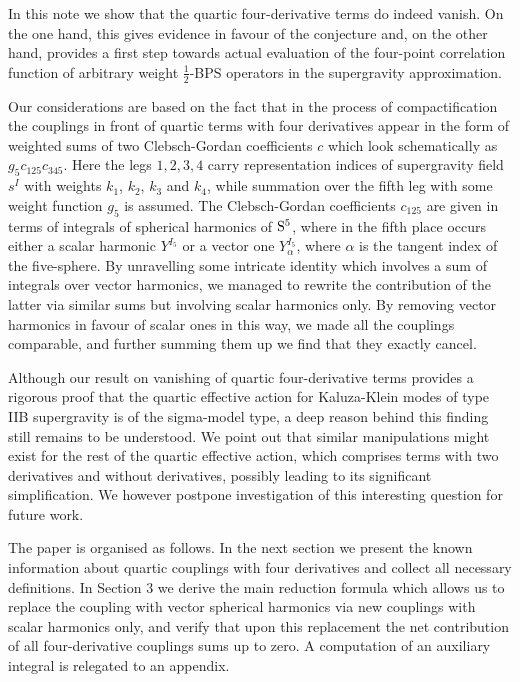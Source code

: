 \documentclass[12pt,a4paper]{article}
\numberwithin{equation}{section}
\def\a {\alpha}
\newcommand{\sfrac}[2]{{\textstyle\frac{#1}{#2}}}
\def\a {\alpha}
\begin{document}
In this note we show that the quartic four-derivative terms do indeed vanish. On the one hand, this gives evidence in favour of the conjecture  \cite{Rastelli:2016nze}
and, on the other hand, provides a first step towards actual evaluation of the four-point correlation function of arbitrary weight $\sfrac{1}{2}$-BPS operators in the supergravity approximation.

Our considerations are based on the fact that in the process of compactification the couplings in front of quartic terms with four derivatives 
appear in the form of weighted sums of two Clebsch-Gordan coefficients $c$ which look schematically as $g_5c_{125}c_{345}$. Here the legs $1,2,3,4$ carry representation indices  of 
supergravity field $s^I$ with weights $k_1$, $k_2$, $k_3$ and $k_4$, while summation over the fifth leg with some weight function $g_5$
is assumed.  The Clebsch-Gordan coefficients $c_{125}$ are given in terms of integrals of spherical harmonics of ${\rm S}^5$, where
in the fifth place occurs either a scalar harmonic $Y^{I_5}$ or a vector one   $Y_{\a}^{I_5}$, where $\a$ is the tangent index of the five-sphere. By unravelling 
some intricate identity which involves a sum of integrals over vector harmonics, we managed to rewrite the contribution of the latter 
via similar sums but involving scalar harmonics only.   By removing vector harmonics in favour of scalar ones in this way, we made all the couplings comparable,
and further summing them up we find that they exactly cancel.

Although our result on vanishing of quartic four-derivative terms provides a rigorous proof that the quartic effective action for Kaluza-Klein modes of type IIB supergravity is of the sigma-model 
type, a deep reason behind this finding still remains to be understood.  We point out that similar manipulations might exist for the rest of the quartic effective action, which comprises 
terms with two derivatives and without derivatives, possibly leading to its significant simplification.  
We however postpone investigation of this interesting question for future work.

The paper is organised as follows. In the next section we present the known information about quartic couplings with four derivatives and collect all necessary 
definitions. In Section 3 we derive the main reduction formula which allows us to replace the coupling with vector spherical harmonics via new couplings with scalar harmonics only,
and verify that upon this replacement the net contribution of all four-derivative couplings sums up to zero. A  computation of an auxiliary integral is relegated to an appendix. 
\end{document}

